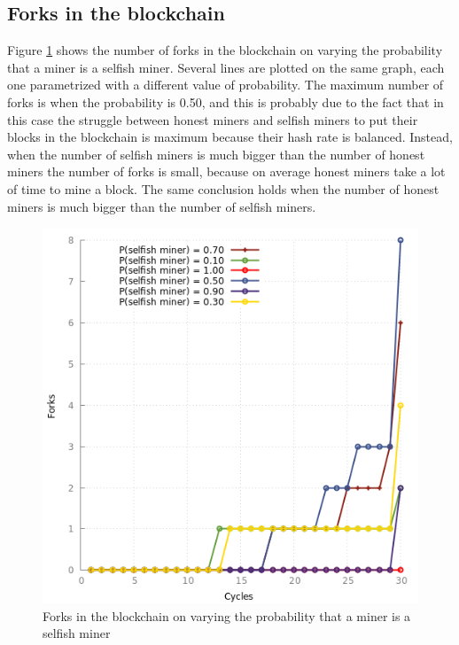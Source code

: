 \documentclass{article}
\begin{document}
\subsection{Forks in the blockchain}
Figure \ref{fig:forks} shows the number of forks in the blockchain on varying the probability that a miner is a selfish miner. Several lines are plotted on the same graph, each one parametrized with a different value of probability. The maximum number of forks is when the probability is 0.50, and this is probably due to the fact that in this case the struggle between honest miners and selfish miners to put their blocks in the blockchain is maximum because their hash rate is balanced. Instead, when the number of selfish miners is much bigger than the number of honest miners the number of forks is small, because on average honest miners take a lot of time to mine a block. The same conclusion holds when the number of honest miners is much bigger than the number of selfish miners.
\begin{figure}
\centerline{\includegraphics[scale=0.50]{plots/forks}}
\caption{Forks in the blockchain on varying the probability that a miner is a selfish miner}
\label{fig:forks}
\end{figure}
\end{document}
